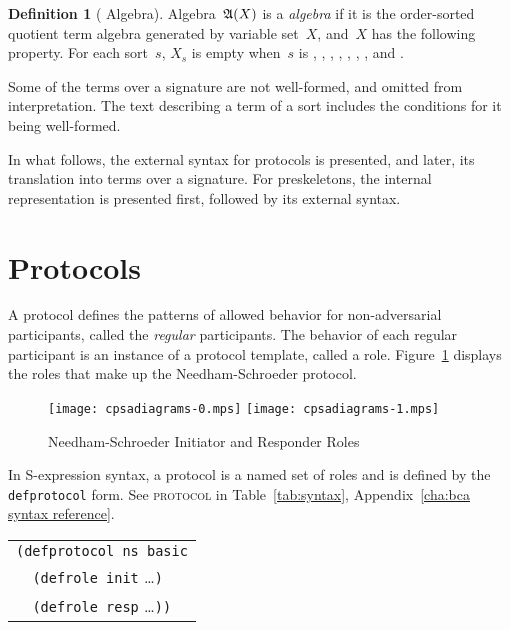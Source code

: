 \documentclass[12pt]{report}
\theoremstyle{definition}
\newtheorem{defn}{Definition}[chapter]
\begin{document}
\begin{defn}[{\cpsa} Algebra]\label{def:cpsa algebra}
 Algebra~$\mathfrak A(X)$ is a \emph{{\cpsa}
  algebra} if it is the order-sorted quotient term algebra generated
by variable set~$X$, and~$X$ has the following property.  For each
sort~$s$, $X_s$ is empty when~$s$ is , ,
, , , , ,
and .
\end{defn}

Some of the terms over a {\cpsa} signature are not
well-formed, and omitted from interpretation.  The
text describing a term of a sort includes the conditions for it being
well-formed.

In what follows, the external syntax for protocols is presented, and
later, its translation into terms over a {\cpsa} signature.  For
preskeletons, the internal representation is presented first, followed
by its external syntax.

\section{Protocols}

A protocol defines the patterns of allowed behavior for
non-adversarial participants, called the \emph{regular} participants.  The behavior of each
regular participant is an instance of a protocol template, called a
role.  Figure~\ref{fig:ns roles} displays the roles that make up the
Needham-Schroeder protocol.

\begin{figure}
\begin{center}
\texttt{[image: cpsadiagrams-0.mps]}\hfil
\texttt{[image: cpsadiagrams-1.mps]}
\caption{Needham-Schroeder Initiator and Responder Roles}
\label{fig:ns roles}
\end{center}
\end{figure}

In S-expression syntax, a protocol is a named set of roles and is
defined by the \texttt{defprotocol} form.  See \textsc{protocol} in
Table~\ref{tab:syntax}, Appendix~\ref{cha:bca syntax reference}.
\begin{center}
\begin{tabular}{l}
\verb|(defprotocol ns basic|\\
\verb|  (defrole init| \ldots\texttt{)}\\
\verb|  (defrole resp| \ldots\texttt{))}
\end{tabular}
\end{center}
\end{document}
